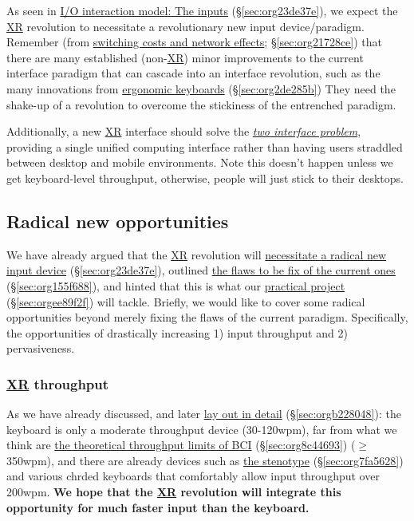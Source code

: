 \documentclass[logo,bsc,singlespacing,parskip]{infthesis}
\begin{document}
As seen in \hyperref[sec:org23de37e]{I/O interaction model: The inputs} (\S \ref{sec:org23de37e}), we expect the \hyperref[orgf7f8e78]{XR} revolution to necessitate a revolutionary new input device/paradigm.
Remember (from \hyperref[sec:org21728ce]{switching costs and network effects}; \S \ref{sec:org21728ce}) that there are many established (non-\hyperref[orgf7f8e78]{XR}) minor improvements to the current interface paradigm that
can cascade into an interface revolution, such as the many innovations from \hyperref[sec:org2de285b]{ergonomic keyboards} (\S \ref{sec:org2de285b})
They need the shake-up of a revolution to overcome the stickiness of the entrenched paradigm.

Additionally, a new \hyperref[orgf7f8e78]{XR} interface should solve the \emph{\hyperref[two interface problem]{two interface problem}}, providing a single unified computing interface rather than having users straddled between desktop and mobile environments.
Note this doesn't happen unless we get keyboard-level throughput, otherwise, people will just stick to their desktops.

\subsection{Radical new opportunities}
\label{sec:orgd0fa1a6}
We have already argued that the \hyperref[orgf7f8e78]{XR} revolution will \hyperref[sec:org23de37e]{necessitate a radical new input device} (\S \ref{sec:org23de37e}), outlined \hyperref[sec:org155f688]{the flaws to be fix of the current ones} (\S \ref{sec:org155f688}), and hinted that this is what our \hyperref[sec:orgee89f2f]{practical project} (\S \ref{sec:orgee89f2f}) will tackle.
Briefly, we would like to cover some radical opportunities beyond merely fixing the flaws of the current paradigm.
Specifically, the opportunities of drastically increasing 1) input throughput and 2) pervasiveness.

\subsubsection{\hyperref[orgf7f8e78]{XR} throughput}
\label{sec:org5236f4c}
As we have already discussed, and later \hyperref[sec:orgb228048]{lay out in detail} (\S \ref{sec:orgb228048}): the keyboard is only a moderate throughput device (30-120wpm), far from what we think are \hyperref[sec:org8c44693]{the theoretical throughput limits of BCI} (\S \ref{sec:org8c44693}) (\(\ge\)350wpm), and there are already devices such as \hyperref[sec:org7fa5628]{the stenotype} (\S \ref{sec:org7fa5628}) and various chrded keyboards  that comfortably allow input throughput over 200wpm.
\textbf{We hope that the \hyperref[orgf7f8e78]{XR} revolution will integrate this opportunity for much faster input than the keyboard.}
\end{document}
